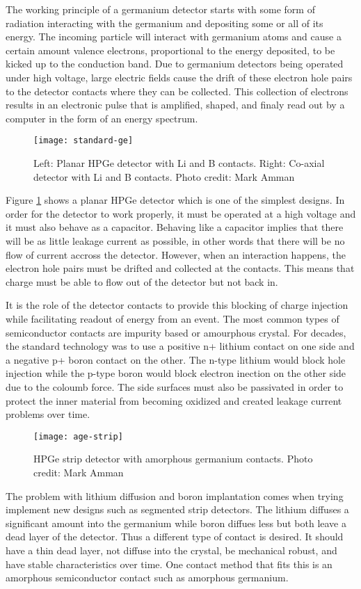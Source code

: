 The working principle of a germanium detector starts with some form of radiation interacting with the germanium and depositing some or all of its energy.
The incoming particle will interact with germanium atoms and cause a certain amount valence electrons, proportional to the energy deposited, to be kicked up to the conduction band.
Due to germanium detectors being operated under high voltage, large electric fields cause the drift of these electron hole pairs to the detector contacts where they can be collected.
This collection of electrons results in an electronic pulse that is amplified, shaped, and finaly read out by a computer in the form of an energy spectrum.
\begin{figure}[htpb]
\centering
\texttt{[image: standard-ge]}
\caption{Left: Planar HPGe detector with Li and B contacts. Right: Co-axial detector with Li and B contacts. Photo credit: Mark Amman}
\label{fig:standard-ge}
\end{figure}
Figure \ref{fig:standard-ge} shows a planar HPGe detector which is one of the simplest designs.
In order for the detector to work properly, it must be operated at a high voltage and it must also behave as a capacitor.
Behaving like a capacitor implies that there will be as little leakage current as possible, in other words that there will be no flow of current accross the detector.
However, when an interaction happens, the electron hole pairs must be drifted and collected at the contacts.
This means that charge must be able to flow out of the detector but not back in.

It is the role of the detector contacts to provide this blocking of charge injection while facilitating readout of energy from an event.
The most common types of semiconductor contacts are impurity based or amourphous crystal.
For decades, the standard technology was to use a positive n+ lithium contact on one side and a negative p+ boron contact on the other.
The n-type lithium would block hole injection while the p-type boron would block electron inection on the other side due to the coloumb force.
The side surfaces must also be passivated in order to protect the inner material from becoming oxidized and created leakage current problems over time.

\begin{figure}[htpb]
\centering
\texttt{[image: age-strip]}
\caption{HPGe strip detector with amorphous germanium contacts. Photo credit: Mark Amman}
\label{fig:age-strip}
\end{figure}
The problem with lithium diffusion and boron implantation comes when trying implement new designs such as segmented strip detectors.
The lithium diffuses a significant amount into the germanium while boron diffues less but both leave a dead layer of the detector.
Thus a different type of contact is desired.
It should have a thin dead layer, not diffuse into the crystal, be mechanical robust, and have stable characteristics over time.
One contact method that fits this is an amorphous semiconductor contact such as amorphous germanium.

